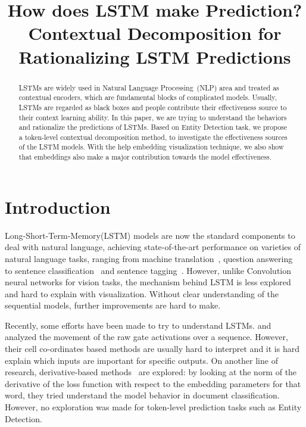 \documentclass{article}
\title{How does LSTM make Prediction? Contextual Decomposition for Rationalizing LSTM Predictions}
\begin{document}
\maketitle


\begin{abstract}

LSTMs are widely used in Natural Language Processing~(NLP) area and treated as contextual encoders, which are fundamental blocks of complicated models. Usually, LSTMs are regarded as black boxes and people contribute their effectiveness source to their context learning ability. In this paper, we are trying to understand the behaviors and rationalize the predictions of LSTMs. Based on Entity Detection task, we propose a token-level contextual decomposition method, to investigate the effectiveness sources of the LSTM models. With the help embedding visualization technique, we also show that embeddings also make a major contribution towards the model effectiveness.

\end{abstract}

\section{Introduction}

Long-Short-Term-Memory(LSTM) models are now the standard components to deal with natural language, achieving state-of-the-art performance on varieties of natural language tasks, ranging from machine translation~\cite{sutskever2014sequence}, question answering~\cite{tan2015lstm} to sentence classification~\cite{liu2016recurrent} and sentence tagging~\cite{chiu2016named}. However, unlike Convolution neural networks for vision tasks, the mechanism behind LSTM is less explored and hard to explain with visualization. Without clear understanding of the sequential models, further improvements are hard to make.

 Recently, some efforts have been made to try to understand LSTMs. \citet{strobelt2018lstmvis} and \citet{karpathy2015visualizing} analyzed the movement of the raw gate activations over a sequence. However, their cell co-ordinates based methods are usually hard to interpret and it is hard explain which inputs are important for specific outputs. On another line of research, derivative-based methods~\cite{alikaniotis2016automatic, denil2014extraction} are explored: by looking at the norm of the derivative of the loss function with respect to the embedding parameters for that word, they tried understand the model behavior in document classification. However, no exploration was made for token-level prediction tasks such as Entity Detection. 
\end{document}
